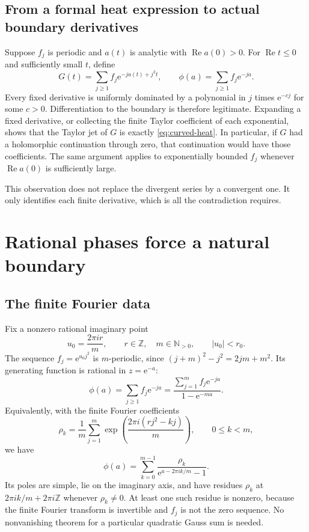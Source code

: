 \documentclass[11pt,a4paper]{article}
\numberwithin{equation}{section}
\theoremstyle{definition}
\theoremstyle{remark}
\newcommand{\N}{\mathbb N}
\newcommand{\ee}{\mathrm e}
\newcommand{\Ree}{\operatorname{Re}}
\begin{document}
\subsection{From a formal heat expression to actual boundary derivatives}
Suppose $f_j$ is periodic and $a(t)$ is analytic with $\Ree a(0)>0$.
For $\Ree t\le0$ and sufficiently small $t$, define
\begin{equation}
 G(t)=\sum_{j\ge1}f_j\ee^{-ja(t)+j^2t},\qquad
 \phi(a)=\sum_{j\ge1}f_j\ee^{-ja}.
 \label{eq:actual-curved-heat}
\end{equation}
Every fixed derivative is uniformly dominated by a polynomial in $j$
times $\ee^{-cj}$ for some $c>0$.  Differentiation to the boundary is
therefore legitimate.  Expanding a fixed derivative, or collecting the
finite Taylor coefficient of each exponential, shows that the Taylor
jet of $G$ is exactly \eqref{eq:curved-heat}.  In particular, if $G$ had
a holomorphic continuation through zero, that continuation would have
those coefficients.  The same argument applies to exponentially
bounded $f_j$ whenever $\Ree a(0)$ is sufficiently large.

This observation does not replace the divergent series by a convergent
one.  It only identifies each finite derivative, which is all the
contradiction requires.

\section{Rational phases force a natural boundary}
\label{sec:natural}

\subsection{The finite Fourier data}
Fix a nonzero rational imaginary point
\begin{equation}
 u_0=\frac{2\pi i r}{m},\qquad r\in\mathbb Z,\quad m\in\N_{>0},
 \qquad |u_0|<r_0.
 \label{eq:rational-time}
\end{equation}
The sequence $f_j=\ee^{u_0j^2}$ is $m$-periodic, since
$(j+m)^2-j^2=2jm+m^2$.
Its generating function is rational in $z=\ee^{-a}$:
\begin{equation}
 \phi(a)=\sum_{j\ge1}f_j\ee^{-ja}
     =\frac{\sum_{j=1}^m f_j\ee^{-ja}}{1-\ee^{-ma}}.
 \label{eq:periodic-rational}
\end{equation}
Equivalently, with the finite Fourier coefficients
\begin{equation}
 \rho_k=\frac1m\sum_{j=1}^m
             \exp\left(\frac{2\pi i(rj^2-kj)}m\right),
       \qquad 0\le k<m,
 \label{eq:gauss-fourier}
\end{equation}
we have
\begin{equation}
 \phi(a)=\sum_{k=0}^{m-1}
       \frac{\rho_k}{\ee^{a-2\pi ik/m}-1}.
 \label{eq:fourier-poles}
\end{equation}
Its poles are simple, lie on the imaginary axis, and have residues
$\rho_k$ at $2\pi ik/m+2\pi i\mathbb Z$ whenever $\rho_k\ne0$.
At least one such residue is nonzero, because the finite Fourier
transform is invertible and $f_j$ is not the zero sequence.
No nonvanishing theorem for a particular quadratic Gauss sum is needed.
\end{document}
